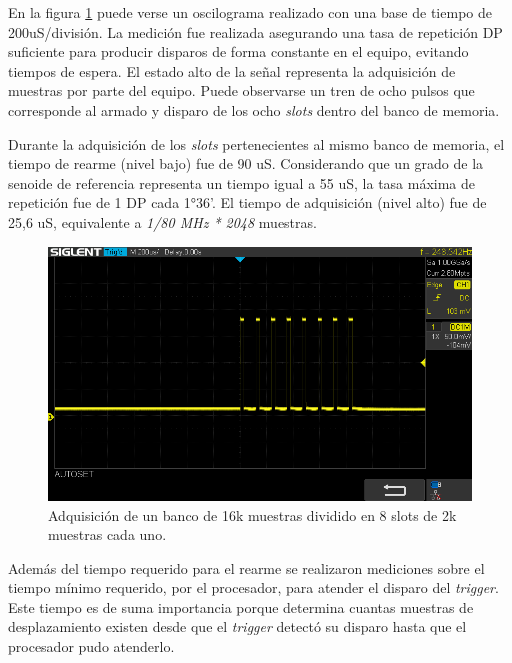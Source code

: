 En la figura \ref{fig:oscDisparos} puede verse un oscilograma realizado con una base de tiempo de 200uS/división. La medición fue realizada asegurando una tasa de repetición DP suficiente para producir disparos de forma constante en el equipo, evitando tiempos de espera. El estado alto de la señal representa la adquisición de muestras por parte del equipo. Puede observarse un tren de ocho pulsos que corresponde al armado y disparo de los ocho \textit{slots} dentro del banco de memoria.

Durante la adquisición de los \textit{slots} pertenecientes al mismo banco de memoria, el tiempo de rearme (nivel bajo) fue de 90 uS. Considerando que un grado de la senoide de referencia representa un tiempo igual a 55 uS, la tasa máxima de repetición fue de 1 DP cada 1°36’. El tiempo de adquisición (nivel alto) fue de 25,6 uS, equivalente a \textit{1/80 MHz * 2048} muestras. 

\vspace{5mm}

\begin{figure}[ht]
	\centering
	\includegraphics[width=140mm]{./Figures/disparos.png}
	\caption{Adquisición de un banco de 16k muestras dividido en 8 slots de 2k muestras cada uno.}
	\label{fig:oscDisparos}
\end{figure}

\vspace{5mm}

Además del tiempo requerido para el rearme se realizaron mediciones sobre el tiempo mínimo requerido, por el procesador, para atender el disparo del \textit{trigger}. Este tiempo es de suma importancia porque determina cuantas muestras de desplazamiento existen desde que el \textit{trigger} detectó su disparo hasta que el procesador pudo atenderlo. 


